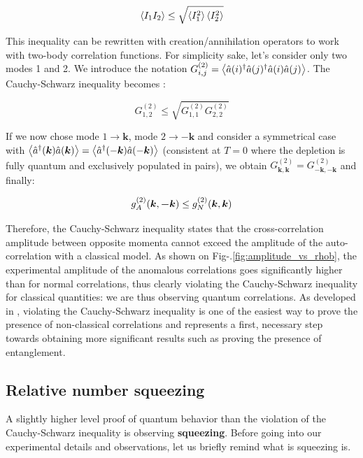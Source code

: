 \begin{equation}
    \left\langle I_1 I_2\right\rangle \leq \sqrt{\left\langle I_1^2\right\rangle \left\langle I_2^2\right\rangle}
\end{equation}

This inequality can be rewritten with creation/annihilation operators to work with two-body correlation functions. For simplicity sake, let's consider only two modes 1 and 2. We introduce the notation $G^{(2)}_{i,j} = \left\langle\hat{a}(i)^{\dagger} \hat{a}(j)^{\dagger} \hat{a}(i) \hat{a}(j)\right\rangle$. The Cauchy-Schwarz inequality becomes \cite{kheruntsyan2012violation,walls2008}:

\begin{equation}
    G^{(2)}_{1,2} \leq \sqrt{G^{(2)}_{1,1} G^{(2)}_{2,2} }
\end{equation}

If we now chose mode $1 \rightarrow \bm{k}$, mode $2 \rightarrow -\bm{k}$ and consider a symmetrical case with $\left\langle\hat{a}^{\dagger}(\bm{k}) \hat{a}(\bm{k})\right\rangle=\left\langle\hat{a}^{\dagger}(-\bm{k}) \hat{a}(-\bm{k})\right\rangle$ (consistent at $T=0$ where the depletion is fully quantum and exclusively populated in pairs), we obtain $G^{(2)}_{\bm{k},\bm{k}}=G^{(2)}_{-\bm{k},-\bm{k}}$ and finally:

\begin{equation}
    g^{(2)}_A (\bm{k},\bm{-k}) \leq g^{(2)}_N (\bm{k},\bm{k})
\end{equation}

Therefore, the Cauchy-Schwarz inequality states that the cross-correlation amplitude between opposite momenta cannot exceed the amplitude of the auto-correlation with a classical model. As shown on Fig-.\ref{fig:amplitude_vs_rhob}, the experimental amplitude of the anomalous correlations goes significantly higher than for normal correlations, thus clearly violating the Cauchy-Schwarz inequality for classical quantities: we are thus observing quantum correlations. As developed in \cite{kheruntsyan2012violation}, violating the Cauchy-Schwarz inequality is one of the easiest way to prove the presence of non-classical correlations and represents a first, necessary step towards obtaining more significant results such as proving the presence of entanglement.

\subsection{Relative number squeezing}

A slightly higher level proof of quantum behavior than the violation of the Cauchy-Schwarz inequality is observing \textbf{squeezing}. Before going into our experimental details and observations, let us briefly remind what is squeezing is.


